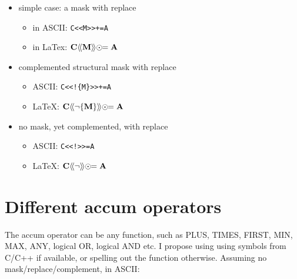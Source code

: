 \documentclass[11pt]{article}
\begin{document}
\begin{itemize}

    \item simple case: a mask with replace
    
        \begin{itemize}
        \item[] in ASCII: \verb'C<<M>>+=A'
        \item[] in LaTex: $\bf C \langle\!\langle M \rangle\!\rangle \odot\!\!= A $
        \end{itemize}
    
    \item complemented structural mask with replace
    
        \begin{itemize}
        \item[] ASCII: \verb'C<<!{M}>>+=A'
        \item[] LaTeX: ${\bf C} \langle\!\langle \neg \{{\bf M}\}
        \rangle\!\rangle \odot\!\!= {\bf A}$
        \end{itemize}
    
    \item no mask, yet complemented, with replace
    
        \begin{itemize}
        \item[] ASCII: \verb'C<<!>>=A'
        \item[] LaTeX: ${\bf C} \langle\!\langle \neg \rangle\!\rangle \odot\!\!= {\bf A}$
        \end{itemize}

\end{itemize}

\section{Different accum operators}

The accum operator can be any function, such as PLUS, TIMES, FIRST, MIN, MAX,
ANY, logical OR, logical AND etc.  I propose using using symbols from C/C++ if 
available, or spelling out the function otherwise.
Assuming no mask/replace/complement, in ASCII:
\end{document}
